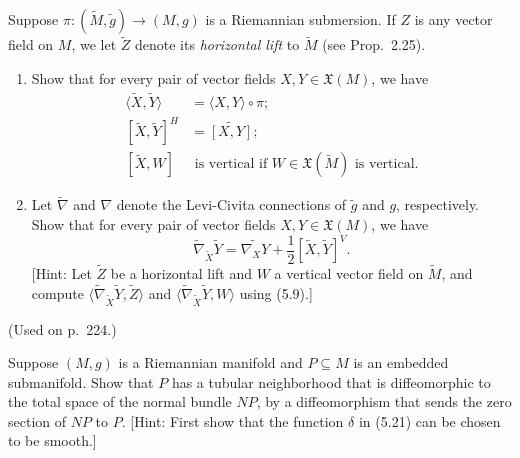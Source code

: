 \begin{exercise}
\label{prob:riemannian-submersion-connection}

Suppose $\pi: (\tilde{M}, \tilde{g}) \to (M, g)$ is a Riemannian submersion. If $Z$ is any vector field on $M$, we let $\tilde{Z}$ denote its \emph{horizontal lift} to $\tilde{M}$ (see Prop.~2.25).
\begin{enumerate}
\item[(a)] Show that for every pair of vector fields $X, Y \in \mathfrak{X}(M)$, we have
\begin{align*}
\langle \tilde{X}, \tilde{Y} \rangle &= \langle X, Y \rangle \circ \pi; \\
[\tilde{X}, \tilde{Y}]^H &= \widetilde{[X, Y]}; \\
[\tilde{X}, W] &\text{ is vertical if } W \in \mathfrak{X}(\tilde{M}) \text{ is vertical.}
\end{align*}
\item[(b)] Let $\tilde{\nabla}$ and $\nabla$ denote the Levi-Civita connections of $\tilde{g}$ and $g$, respectively. Show that for every pair of vector fields $X, Y \in \mathfrak{X}(M)$, we have
\begin{equation}
\tilde{\nabla}_{\tilde{X}} \tilde{Y} = \widetilde{\nabla_X Y} + \frac{1}{2} [\tilde{X}, \tilde{Y}]^V. \tag{5.27}
\end{equation}
[Hint: Let $\tilde{Z}$ be a horizontal lift and $W$ a vertical vector field on $\tilde{M}$, and compute $\langle \tilde{\nabla}_{\tilde{X}} \tilde{Y}, \tilde{Z} \rangle$ and $\langle \tilde{\nabla}_{\tilde{X}} \tilde{Y}, W \rangle$ using (5.9).]
\end{enumerate}
(Used on p.\ 224.)
\end{exercise}

\begin{exercise}
\label{prob:tubular-neighborhood-normal-bundle}

Suppose $(M,g)$ is a Riemannian manifold and $P \subseteq M$ is an embedded submanifold. Show that $P$ has a tubular neighborhood that is diffeomorphic to the total space of the normal bundle $NP$, by a diffeomorphism that sends the zero section of $NP$ to $P$. [Hint: First show that the function $\delta$ in (5.21) can be chosen to be smooth.]
\end{exercise}
